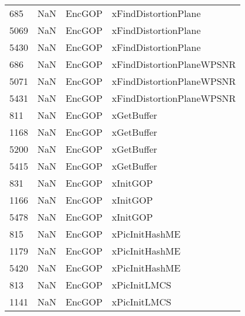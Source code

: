\begin{tabular}{llll}
685  &                   NaN &                     EncGOP &                      xFindDistortionPlane \\
5069 &                   NaN &                     EncGOP &                      xFindDistortionPlane \\
5430 &                   NaN &                     EncGOP &                      xFindDistortionPlane \\
686  &                   NaN &                     EncGOP &                 xFindDistortionPlaneWPSNR \\
5071 &                   NaN &                     EncGOP &                 xFindDistortionPlaneWPSNR \\
5431 &                   NaN &                     EncGOP &                 xFindDistortionPlaneWPSNR \\
811  &                   NaN &                     EncGOP &                                xGetBuffer \\
1168 &                   NaN &                     EncGOP &                                xGetBuffer \\
5200 &                   NaN &                     EncGOP &                                xGetBuffer \\
5415 &                   NaN &                     EncGOP &                                xGetBuffer \\
831  &                   NaN &                     EncGOP &                                  xInitGOP \\
1166 &                   NaN &                     EncGOP &                                  xInitGOP \\
5478 &                   NaN &                     EncGOP &                                  xInitGOP \\
815  &                   NaN &                     EncGOP &                            xPicInitHashME \\
1179 &                   NaN &                     EncGOP &                            xPicInitHashME \\
5420 &                   NaN &                     EncGOP &                            xPicInitHashME \\
813  &                   NaN &                     EncGOP &                              xPicInitLMCS \\
1141 &                   NaN &                     EncGOP &                              xPicInitLMCS \\

\end{tabular}
